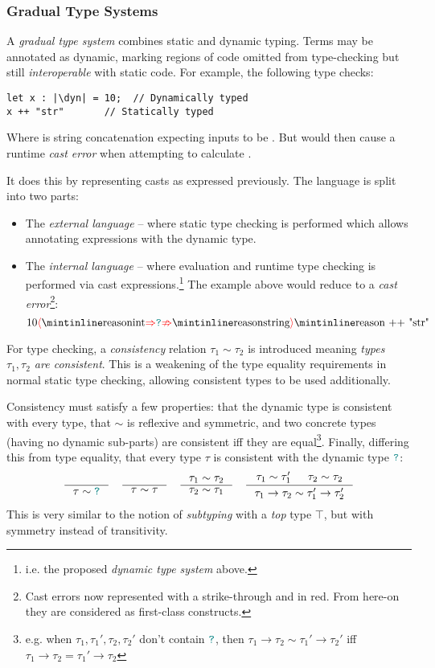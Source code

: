 \subsubsection{Gradual Type Systems}\label{sec:GradualTypeSystem}

A \textit{gradual type system} \cite{GradualRefined, GradualFunctional} combines static and dynamic typing. Terms may be annotated as dynamic, marking regions of code omitted from type-checking but still \textit{interoperable} with static code. For example, the following type checks:
\begin{verbatim}
let x : |\dyn| = 10;  // Dynamically typed
x ++ "str"       // Statically typed
\end{verbatim}
Where \code{++} is string concatenation expecting inputs to be . But would then cause a runtime \textit{cast error} when attempting to calculate .

It does this by representing casts as expressed previously. The language is split into two parts:
\begin{itemize}
\item The \textit{external language} -- where static type checking is performed which allows annotating expressions with the dynamic type.
\item The \textit{internal language} -- where evaluation and runtime type checking is performed via cast expressions.\footnote{i.e. the proposed \textit{dynamic type system} above.} The example above would reduce to a \textit{cast error}\footnote{Cast errors now represented with a strike-through and in red. From here-on they are considered as first-class constructs.}: \[10\scasterror{\code{int}}{\code{string}}\code{ ++ "str"}\]
\end{itemize}
For type checking, a \textit{consistency} relation $\tau_1 \sim \tau_2$ is introduced meaning \textit{types $\tau_1, \tau_2$ are consistent}. This is a weakening of the type equality requirements in normal static type checking, allowing consistent types to be used additionally.

Consistency must satisfy a few properties: that the dynamic type is consistent with every type, that $\sim$ is reflexive and symmetric, and two concrete types (having no  dynamic sub-parts) are consistent iff they are equal\footnote{e.g. when $\tau_1, \tau_1', \tau_2, \tau_2'$ don't contain ${\color{teal}\texttt{?}}$, then $\tau_1 \to \tau_2 \sim \tau_1' \to \tau_2'$ iff $\tau_1 \to \tau_2 = \tau_1' \to \tau_2$}. Finally, differing this from type equality, that every type $\tau$ is consistent with the dynamic type ${\color{teal}\texttt{?}}$:
\[\inference{}{\tau \sim \dyn} \quad \inference{}{\tau \sim \tau} \quad \inference{\tau_1 \sim \tau_2}{\tau_2 \sim \tau_1} \quad \inference{\tau_1 \sim \tau_1' & \tau_2 \sim \tau_2}{\tau_1 \to \tau_2 \sim \tau_1' \to \tau_2'}\]
This is very similar to the notion of \textit{subtyping} \cite[ch. 15]{TAPL} with a \textit{top} type $\top$, but with symmetry instead of transitivity.

